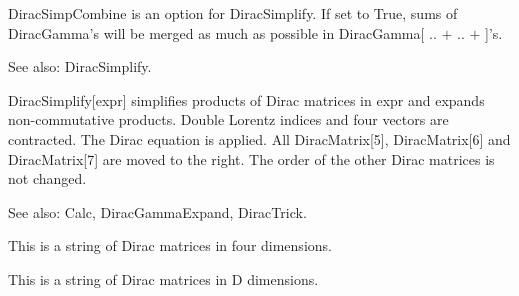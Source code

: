 DiracSimpCombine is an option for DiracSimplify. If set to True, sums of DiracGamma's will be merged as much as possible in DiracGamma[
  .. \(+\) .. \(+\) ]'s.

See also: DiracSimplify.



DiracSimplify[expr] simplifies products of Dirac matrices in expr and expands non-commutative products. Double Lorentz indices and four
  vectors are contracted. The Dirac equation is applied. All DiracMatrix[5], DiracMatrix[6] and DiracMatrix[7] are moved to the right.
  The order of the other Dirac matrices is not changed.



See also:  Calc, DiracGammaExpand, DiracTrick.


This is a string of Dirac matrices in four dimensions.




\dispSFoutmath{
-2\multsp {{\gamma }^{\nu }}
}

This is a string of Dirac matrices in D dimensions.



